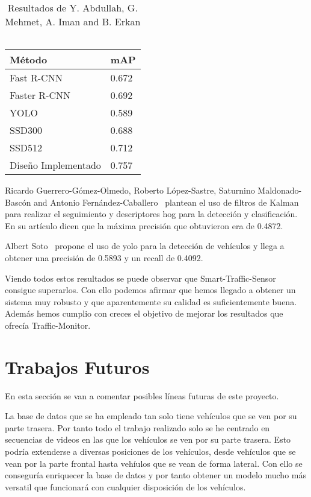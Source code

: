 \begin{table}[htbp][H] 
\begin{center}
\begin{tabular}{|l|l|}
\hline
Método & mAP  \\ 
\hline \hline
Fast R-CNN & 0.672  \\ \hline
Faster R-CNN & 0.692 \\ \hline
YOLO & 0.589  \\ \hline
SSD300  & 0.688 \\ \hline
SSD512  & 0.712 \\ \hline
Diseño Implementado & 0.757 \\ \hline
\end{tabular}
\caption{Resultados de Y. Abdullah, G. Mehmet, A. Iman and B. Erkan ~\cite{rcnn_detection}}
\label{resultados_lchen}
\end{center}
\end{table}

Ricardo Guerrero-Gómez-Olmedo, Roberto López-Sastre, Saturnino Maldonado-Bascón and Antonio Fernández-Caballero~\cite{gram-tracking} plantean el uso de filtros de Kalman para realizar el seguimiento y descriptores \acrshort{hog} para la detección y clasificación. En su artículo dicen que la máxima precisión que obtuvieron era de 0.4872.

Albert Soto~\cite{albert_soto} propone el uso de \acrshort{yolo} para la detección de vehículos y llega a obtener una precisión de 0.5893 y un recall de 0.4092.

Viendo todos estos resultados se puede observar que Smart-Traffic-Sensor consigue superarlos. Con ello podemos afirmar que hemos llegado a obtener un sistema muy robusto y que aparentemente su calidad es suficientemente buena.
Además hemos cumplio con creces el objetivo de mejorar los resultados que ofrecía Traffic-Monitor.

\section{Trabajos Futuros}

En esta sección se van a comentar posibles líneas futuras de este proyecto.

La base de datos que se ha empleado tan solo tiene vehículos que se ven por su parte trasera. Por tanto todo el trabajo realizado solo se he centrado en secuencias de videos en las que los vehículos se ven por su parte trasera. Esto podría extenderse a diversas posiciones de los vehículos, desde vehículos que se vean por la parte frontal hasta vehíulos que se vean de forma lateral. Con ello se conseguría enriquecer la base de  datos y por tanto obtener un modelo mucho más versatil que funcionará con cualquier disposición de los vehículos.

